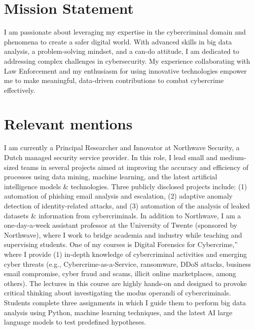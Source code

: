 \documentclass[print]{styles/friggeri-cv-mac} %
\begin{document}
\section{Mission Statement}\vspace{-10pt}
I am passionate about leveraging my expertise in the cybercriminal domain and phenomena to create a safer digital world. With advanced skills in big data analysis, a problem-solving mindset, and a can-do attitude, I am dedicated to addressing complex challenges in cybersecurity. My experience collaborating with Law Enforcement and my enthusiasm for using innovative technologies empower me to make meaningful, data-driven contributions to combat cybercrime effectively.

\section{Relevant mentions}\vspace{-10pt}
I am currently a Principal Researcher and Innovator at Northwave Security, a Dutch managed security service provider. In this role, I lead small and medium-sized teams in several projects aimed at improving the accuracy and efficiency of processes using data mining, machine learning, and the latest artificial intelligence models \& technologies. Three publicly disclosed projects include: (1) automation of phishing email analysis and escalation, (2) adaptive anomaly detection of identity-related attacks, and (3) automation of the analysis of leaked datasets \& information from cybercriminals.
%
\newline
In addition to Northwave, I am a one-day-a-week assistant professor at the University of Twente (sponsored by Northwave), where I work to bridge academia and industry while teaching and supervising students. One of my courses is Digital Forensics for Cybercrime,'' where I provide (1) in-depth knowledge of cybercriminal activities and emerging cyber threats (e.g., Cybercrime-as-a-Service, ransomware, DDoS attacks, business email compromise, cyber fraud and scams, illicit online marketplaces, among others). The lectures in this course are highly hands-on and designed to provoke critical thinking about investigating the modus operandi of cybercriminals. Students complete three assignments in which I guide them to perform big data analysis using Python, machine learning techniques, and the latest AI large language models to test predefined hypotheses.   
% 
\newline   
\end{document}
